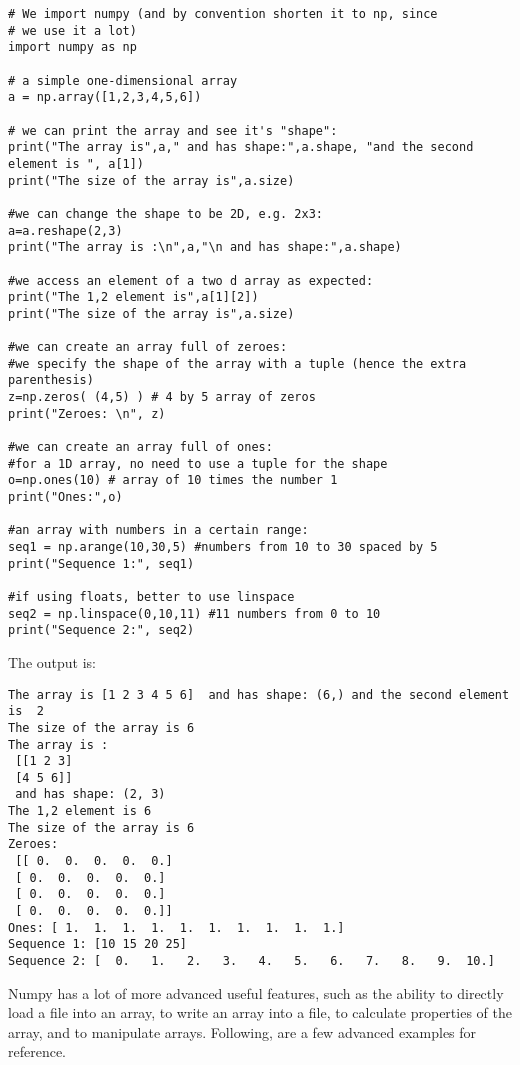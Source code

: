 \begin{lstlisting}[frame=single] 
# We import numpy (and by convention shorten it to np, since
# we use it a lot)
import numpy as np

# a simple one-dimensional array
a = np.array([1,2,3,4,5,6])

# we can print the array and see it's "shape":
print("The array is",a," and has shape:",a.shape, "and the second element is ", a[1])
print("The size of the array is",a.size)

#we can change the shape to be 2D, e.g. 2x3:
a=a.reshape(2,3)
print("The array is :\n",a,"\n and has shape:",a.shape)

#we access an element of a two d array as expected:
print("The 1,2 element is",a[1][2])
print("The size of the array is",a.size)

#we can create an array full of zeroes:
#we specify the shape of the array with a tuple (hence the extra parenthesis)
z=np.zeros( (4,5) ) # 4 by 5 array of zeros
print("Zeroes: \n", z)

#we can create an array full of ones:
#for a 1D array, no need to use a tuple for the shape
o=np.ones(10) # array of 10 times the number 1
print("Ones:",o)

#an array with numbers in a certain range:
seq1 = np.arange(10,30,5) #numbers from 10 to 30 spaced by 5
print("Sequence 1:", seq1)

#if using floats, better to use linspace
seq2 = np.linspace(0,10,11) #11 numbers from 0 to 10
print("Sequence 2:", seq2)
\end{lstlisting} 
The output is:
\begin{verbatim}
The array is [1 2 3 4 5 6]  and has shape: (6,) and the second element is  2
The size of the array is 6
The array is :
 [[1 2 3]
 [4 5 6]] 
 and has shape: (2, 3)
The 1,2 element is 6
The size of the array is 6
Zeroes: 
 [[ 0.  0.  0.  0.  0.]
 [ 0.  0.  0.  0.  0.]
 [ 0.  0.  0.  0.  0.]
 [ 0.  0.  0.  0.  0.]]
Ones: [ 1.  1.  1.  1.  1.  1.  1.  1.  1.  1.]
Sequence 1: [10 15 20 25]
Sequence 2: [  0.   1.   2.   3.   4.   5.   6.   7.   8.   9.  10.]
\end{verbatim}

Numpy has a lot of more advanced useful features, such as the ability to directly load a file into an array, to write an array into a file, to calculate properties of the array, and to manipulate arrays. Following, are a few advanced examples for reference.

